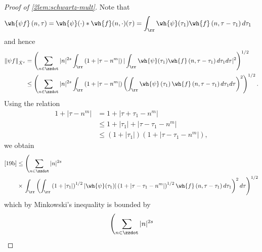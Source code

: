 \begin{proof}[Proof of \cref{2lem:schwartz-mult}]
Note that
%
%
\begin{equation*}
	\begin{split}
		\wh{\psi f}\left( n, \tau \right)
		& = \wh{\psi}(\cdot) * \wh{f}(n,
		\cdot)(\tau)
		= \int_\rr \wh{\psi}(\tau_1) \wh{f} \left( n, \tau - \tau_1 \right) 
		d\tau_1
	\end{split}
\end{equation*}
%
%
and hence
%
%
\begin{equation}
	\label{19b}
	\begin{split}
		\|\psi f\|_{\dot{X}^s} 
		& = \left( \sum_{n \in \zzdot} |n|^{2s} \int_\rr \left( 1 + | \tau -
		n^{m} | \right) | \int_\rr \wh{\psi}(\tau_1) \wh{f}\left( n, \tau -
		\tau_1
		\right)  d \tau_1 d \tau |^2 \right)^{1/2}
		\\
		& \le \left( \sum_{n \in \zzdot} |n|^{2s} \int_\rr \left( 1 + | \tau -
		n^{m }
		|
		\right) \left( \int_\rr \wh{\psi}\left( \tau_1 \right) \wh{f}\left( n,
		\tau - \tau_1
		\right)  d \tau_1 d \tau \right)^2 \right)^{1/2}.
	\end{split}
\end{equation}
%
%
Using the relation
%
%
\begin{equation*}
	\begin{split}
		1 + | \tau - n^{m } |
		& = 1 + | \tau + \tau_1 - n^{m} |
		\\
		& \le 1 + | \tau_1 | + | \tau - \tau_1 - n^{m} |
		\\
		& \le \left( 1 + | \tau_1 | \right)\left( 1 + | \tau - \tau_1 -
		n^{m} | \right),
	\end{split}
\end{equation*}
%
%
we obtain
%
%
\begin{equation*}
	\begin{split}
		\eqref{19b}
		& \le \left( \sum_{n \in \zzdot} |n|^{2s} \right.
		\\
		& \times \left . \int_\rr \left(
		\int_\rr \left( 1 + | \tau_1 | \right)^{1/2} | \wh{\psi}(\tau_1) |
		\left( 1 + | \tau - \tau_1 - n^{m} | \right)^{1/2} \wh{f}\left( n, \tau
		- \tau_1
		\right)d \tau_1
		\right)^2 d \tau \right)^{1/2}
	\end{split}
\end{equation*}
%
%
which by Minkowski's inequality is bounded by
%
%
\begin{equation}
	\label{18a}
	\begin{split}
		& \left( \sum_{n \in \zzdot} |n|^{2s}  \right.
		\\

\end{split}
\end{equation}
\end{proof}
